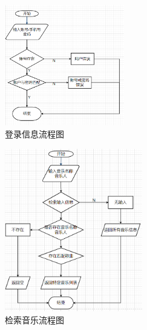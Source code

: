\documentclass[UTF8,14pt]{article}
\numberwithin{figure}{subsubsection}
\numberwithin{table}{subsubsection}
\begin{document}
\begin{minipage}[t]{0.5\linewidth}
	\centering
	\begin{figure}[H]
		\includegraphics[width=5.224cm,height=5.248cm]{白盒2.png}
		\caption{登录信息流程图}
	\end{figure}

	\begin{figure}[H]
		\includegraphics[width=6.01cm,height=7.08cm]{白盒3.png}
		\caption{检索音乐流程图}
	\end{figure}
\end{minipage}
\end{document}
